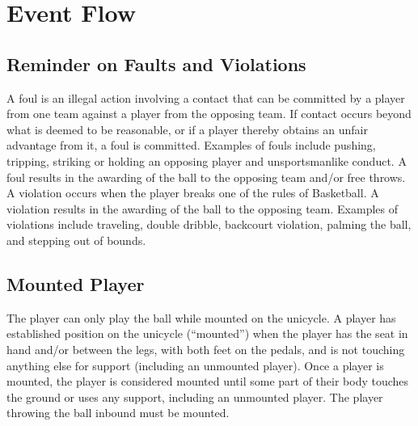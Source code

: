 \section{Event Flow}

\subsection{Reminder on Faults and Violations}
A foul is an illegal action involving a contact that can be committed by a player from one team against a player from the opposing team.
If contact occurs beyond what is deemed to be reasonable, or if a player thereby obtains an unfair advantage from it, a foul is committed.
Examples of fouls include pushing, tripping, striking or holding an opposing player and unsportsmanlike conduct.
A foul results in the awarding of the ball to the opposing team and/or free throws.
A violation occurs when the player breaks one of the rules of Basketball.
A violation results in the awarding of the ball to the opposing team.
Examples of violations include traveling, double dribble, backcourt violation, palming the ball, and stepping out of bounds.

\subsection{Mounted Player}
The player can only play the ball while mounted on the unicycle.
A player has established position on the unicycle (``mounted'') when the player has the seat in hand and/or between the legs, with both feet on the pedals, and is not touching anything else for support (including an unmounted player).
Once a player is mounted, the player is considered mounted until some part of their body touches the ground or uses any support, including an unmounted player.
The player throwing the ball inbound must be mounted.

